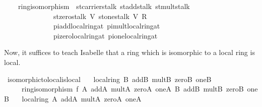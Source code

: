 \documentclass[12pt]{scrartcl}
\begin{document}
\begin{isabelle}
\ \ \ {\isachardoublequoteopen}{\isasymexists}{\isasymphi}{\isachardot}{\kern0pt}\ ring{\isacharunderscore}{\kern0pt}isomorphism\ {\isasymphi}\ st{\isachardot}{\kern0pt}carrier{\isacharunderscore}{\kern0pt}stalk\ st{\isachardot}{\kern0pt}add{\isacharunderscore}{\kern0pt}stalk\ st{\isachardot}{\kern0pt}mult{\isacharunderscore}{\kern0pt}stalk\ \isanewline
\ \ \ \ \ \ \ \ \ \ \ \ \ \ {\isacharparenleft}{\kern0pt}st{\isachardot}{\kern0pt}zero{\isacharunderscore}{\kern0pt}stalk\ V{\isacharparenright}{\kern0pt}\ {\isacharparenleft}{\kern0pt}st{\isachardot}{\kern0pt}one{\isacharunderscore}{\kern0pt}stalk\ V{\isacharparenright}{\kern0pt}\ {\isacharparenleft}{\kern0pt}R\ \isactrlbsub {\isasympp}\ {\isacharparenleft}{\kern0pt}{\isacharplus}{\kern0pt}{\isacharparenright}{\kern0pt}\ {\isacharparenleft}{\kern0pt}{\isasymcdot}{\isacharparenright}{\kern0pt}\ {\isasymzero}\isactrlesub {\isacharparenright}{\kern0pt}\ \isanewline
\ \ \ \ \ \ \ \ \ \ \ \ \ \ {\isacharparenleft}{\kern0pt}pi{\isachardot}{\kern0pt}add{\isacharunderscore}{\kern0pt}local{\isacharunderscore}{\kern0pt}ring{\isacharunderscore}{\kern0pt}at{\isacharparenright}{\kern0pt}\ {\isacharparenleft}{\kern0pt}pi{\isachardot}{\kern0pt}mult{\isacharunderscore}{\kern0pt}local{\isacharunderscore}{\kern0pt}ring{\isacharunderscore}{\kern0pt}at{\isacharparenright}{\kern0pt}\ \isanewline
\ \ \ \ \ \ \ \ \ \ \ \ \ \ {\isacharparenleft}{\kern0pt}pi{\isachardot}{\kern0pt}zero{\isacharunderscore}{\kern0pt}local{\isacharunderscore}{\kern0pt}ring{\isacharunderscore}{\kern0pt}at{\isacharparenright}{\kern0pt}\ {\isacharparenleft}{\kern0pt}pi{\isachardot}{\kern0pt}one{\isacharunderscore}{\kern0pt}local{\isacharunderscore}{\kern0pt}ring{\isacharunderscore}{\kern0pt}at{\isacharparenright}{\kern0pt}{\isachardoublequoteclose}\isanewline
\isanewline
{}
\end{isabelle}

Now, it suffices to teach Isabelle that a ring which is isomorphic to a local ring is local.


\begin{isabelle}
\isamarkupfalse%
\ isomorphic{\isacharunderscore}{\kern0pt}to{\isacharunderscore}{\kern0pt}local{\isacharunderscore}{\kern0pt}is{\isacharunderscore}{\kern0pt}local{\isacharcolon}{\kern0pt}\isanewline
\ \ \ {\isachardoublequoteopen}local{\isacharunderscore}{\kern0pt}ring\ B\ addB\ multB\ zeroB\ oneB{\isachardoublequoteclose}\isanewline
\ \ \ \ \ {\isachardoublequoteopen}ring{\isacharunderscore}{\kern0pt}isomorphism\ f\ A\ addA\ multA\ zeroA\ oneA\ B\ addB\ multB\ zeroB\ oneB{\isachardoublequoteclose}\isanewline
\ \ \ {\isachardoublequoteopen}local{\isacharunderscore}{\kern0pt}ring\ A\ addA\ multA\ zeroA\ oneA{\isachardoublequoteclose}
\end{isabelle}
	
\end{document}
